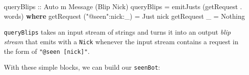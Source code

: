 \documentclass[]{article}
\newenvironment{Shaded}{}{}
\newcommand{\KeywordTok}[1]{\textcolor[rgb]{0.00,0.44,0.13}{\textbf{{#1}}}}
\newcommand{\DataTypeTok}[1]{\textcolor[rgb]{0.56,0.13,0.00}{{#1}}}
\newcommand{\StringTok}[1]{\textcolor[rgb]{0.25,0.44,0.63}{{#1}}}
\newcommand{\OtherTok}[1]{\textcolor[rgb]{0.00,0.44,0.13}{{#1}}}
\newcommand{\FunctionTok}[1]{\textcolor[rgb]{0.02,0.16,0.49}{{#1}}}
\newcommand{\NormalTok}[1]{{#1}}
\begin{document}
\begin{Shaded}
\begin{Highlighting}[]
\OtherTok{queryBlips ::} \DataTypeTok{Auto} \NormalTok{m }\DataTypeTok{Message} \NormalTok{(}\DataTypeTok{Blip} \DataTypeTok{Nick}\NormalTok{)}
\NormalTok{queryBlips }\FunctionTok{=} \NormalTok{emitJusts (getRequest }\FunctionTok{.} \NormalTok{words)}
  \KeywordTok{where}
    \NormalTok{getRequest (}\StringTok{"@seen"}\FunctionTok{:}\NormalTok{nick}\FunctionTok{:}\NormalTok{_) }\FunctionTok{=} \DataTypeTok{Just} \NormalTok{nick}
    \NormalTok{getRequest _                }\FunctionTok{=} \DataTypeTok{Nothing}
\end{Highlighting}
\end{Shaded}

\texttt{queryBlips} takes an input stream of strings and turns it into an output
\emph{blip stream} that emits with a \texttt{Nick} whenever the input stream
contains a request in the form of \texttt{"@seen\ {[}nick{]}"}.

With these simple blocks, we can build our \texttt{seenBot}:
\end{document}
